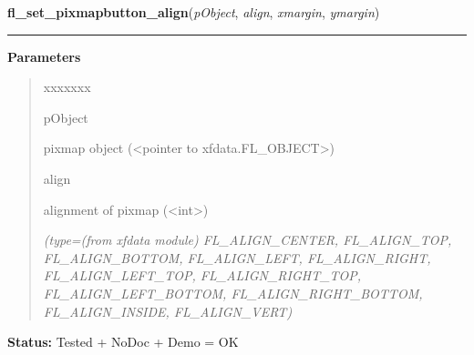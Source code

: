 \hspace{.8\funcindent}\begin{boxedminipage}{\funcwidth}

    \raggedright \textbf{fl\_set\_pixmapbutton\_align}(\textit{pObject}, \textit{align}, \textit{xmargin}, \textit{ymargin})

    \vspace{-1.5ex}

    \rule{\textwidth}{0.5\fboxrule}
\setlength{\parskip}{2ex}
\setlength{\parskip}{1ex}
      \textbf{Parameters}
      \vspace{-1ex}

      \begin{quote}
        \begin{Ventry}{xxxxxxx}

          \item[pObject]

          pixmap object ({\textless}pointer to 
          xfdata.FL\_OBJECT{\textgreater})

          \item[align]

          alignment of pixmap ({\textless}int{\textgreater})

            {\it (type=(from xfdata module) FL\_ALIGN\_CENTER, FL\_ALIGN\_TOP, FL\_ALIGN\_BOTTOM, 
FL\_ALIGN\_LEFT, FL\_ALIGN\_RIGHT, FL\_ALIGN\_LEFT\_TOP, 
FL\_ALIGN\_RIGHT\_TOP, FL\_ALIGN\_LEFT\_BOTTOM, FL\_ALIGN\_RIGHT\_BOTTOM, 
FL\_ALIGN\_INSIDE, FL\_ALIGN\_VERT)}

        \end{Ventry}

      \end{quote}

\textbf{Status:} Tested + NoDoc + Demo = OK



    \end{boxedminipage}

    \label{xformslib:library:fl_set_pixmap_pixmap}

    \vspace{0.5ex}

